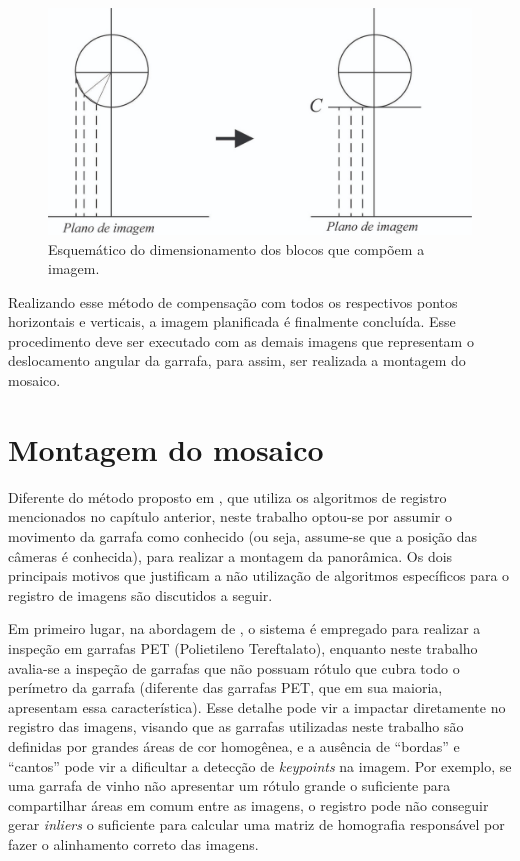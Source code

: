 \begin{figure}[htb]
    \caption{Esquemático do dimensionamento dos blocos que compõem a imagem.}
    \centering
    \vspace{0.3cm}
    \begin{minipage}{.6\textwidth}
         \includegraphics[width=\textwidth]{TCC/Imagens/esq_bloco.jpeg}
	\end{minipage}
    \label{fig:esq_bloco}
\end{figure}

Realizando esse método de compensação com todos os respectivos pontos horizontais e verticais, a imagem planificada é finalmente concluída. Esse procedimento deve ser executado com as demais imagens que representam o deslocamento angular da garrafa, para assim, ser realizada a montagem do mosaico.

\section{Montagem do mosaico}

Diferente do método proposto em \cite{Lin:2013}, que utiliza os algoritmos de registro mencionados no capítulo anterior, neste trabalho optou-se por %
assumir o movimento da garrafa como conhecido (ou seja, assume-se que a posição das câmeras é conhecida), para realizar a montagem da panorâmica. Os dois principais motivos que justificam a não utilização de algoritmos específicos para o registro de imagens são discutidos a seguir.

Em primeiro lugar, na abordagem de \cite{Lin:2013}, o sistema é empregado para realizar a inspeção em garrafas PET (Polietileno Tereftalato), enquanto neste trabalho avalia-se a inspeção de garrafas que não possuam rótulo que cubra todo o perímetro da garrafa (diferente das garrafas PET, que em sua maioria, apresentam essa característica). Esse detalhe pode vir a impactar diretamente no registro das imagens, visando que as garrafas utilizadas neste trabalho são definidas por grandes áreas de cor homogênea, e a ausência de ``bordas'' e ``cantos'' pode vir a dificultar a detecção de \textit{keypoints} na imagem. Por exemplo, se uma garrafa de vinho não apresentar um rótulo grande o suficiente para compartilhar áreas em comum entre as imagens, o registro pode não conseguir gerar \textit{inliers} o suficiente para calcular uma matriz de homografia responsável por fazer o alinhamento correto das imagens.

